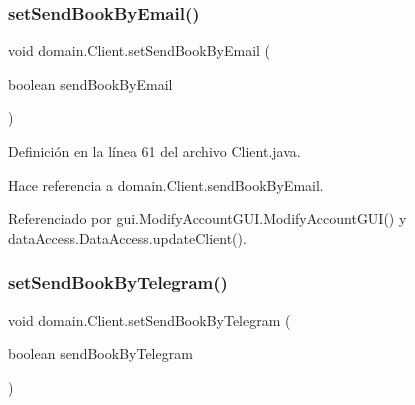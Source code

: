 \mbox{\label{classdomain_1_1_client_acf27654cd7efbc18bb8867a58a272eef}} 
\subsubsection{\texorpdfstring{setSendBookByEmail()}{setSendBookByEmail()}}
{\footnotesize\ttfamily void domain.\+Client.\+set\+Send\+Book\+By\+Email (\begin{DoxyParamCaption}\item[{boolean}]{send\+Book\+By\+Email }\end{DoxyParamCaption})}



Definición en la línea 61 del archivo Client.\+java.


\begin{DoxyCode}{0}

\end{DoxyCode}


Hace referencia a domain.\+Client.\+send\+Book\+By\+Email.



Referenciado por gui.\+Modify\+Account\+G\+U\+I.\+Modify\+Account\+G\+U\+I() y data\+Access.\+Data\+Access.\+update\+Client().

\mbox{\label{classdomain_1_1_client_af38389540adb7dba2798d6b9912b220f}} 
\subsubsection{\texorpdfstring{setSendBookByTelegram()}{setSendBookByTelegram()}}
{\footnotesize\ttfamily void domain.\+Client.\+set\+Send\+Book\+By\+Telegram (\begin{DoxyParamCaption}\item[{boolean}]{send\+Book\+By\+Telegram }\end{DoxyParamCaption})}



